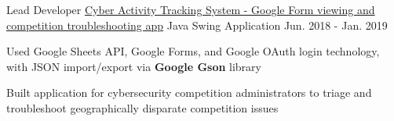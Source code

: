 \begin{cventries}
  \cventry
    {Lead Developer} %
    {\href{https://github.com/hexalellogram/CATS-OSS}{Cyber Activity Tracking System - Google Form viewing and competition troubleshooting app}} %
    {Java Swing Application} %
    {Jun. 2018 - Jan. 2019} %
    {
      \begin{cvitems} %
        \item {Used Google Sheets API, Google Forms, and Google OAuth login technology, with JSON import/export via \textbf{Google Gson} library}
        \item {Built application for cybersecurity competition administrators to triage and troubleshoot geographically disparate competition issues}
      \end{cvitems}
    }
    
\end{cventries}